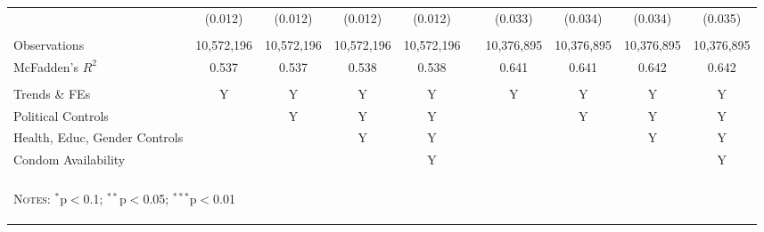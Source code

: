 \begin{landscape}
\begin{table}[!htbp]
{\begin{tabular}{@{\extracolsep{5pt}}lccccp{1mm}cccc}
 &(0.012)&(0.012)&(0.012)&(0.012)&&(0.033)&(0.034)&(0.034)&(0.035)\\
 & & & & & & & & & \\
Observations&10,572,196&10,572,196&10,572,196&10,572,196&&10,376,895&10,376,895&10,376,895&10,376,895\\
McFadden's $R^2$&0.537&0.537&0.538&0.538&&0.641&0.641&0.642&0.642\\
\hline \\[-1.8ex] 
{\small Trends \& FEs} & Y & Y & Y & Y && Y & Y & Y & Y \\
{\small Political Controls} & & Y & Y & Y && & Y & Y & Y \\
{\small Health, Educ, Gender Controls} & & & Y & Y && & & Y & Y \\
{\small Condom Availability} & & & & Y && & & & Y \\
\hline \hline \\[-1.8ex]
\multicolumn{10}{p{22cm}}{\begin{footnotesize}\textsc{Notes:}
$^{*}$p$<$0.1; $^{**}$p$<$0.05; $^{***}$p$<$0.01\end{footnotesize}}
\normalsize\end{tabular}}\end{table}\end{landscape}
